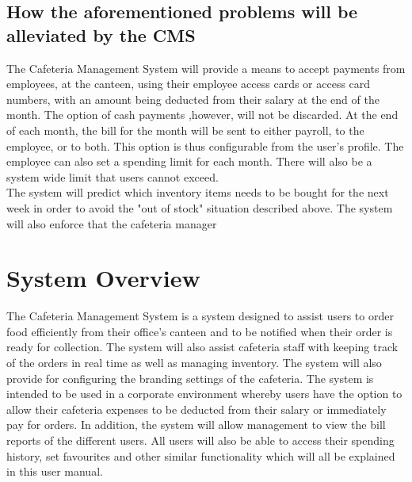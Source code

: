 \documentclass[a4paper,12pt]{report}
\begin{document}
\subsection{How the aforementioned problems will be alleviated by the CMS}
The Cafeteria Management System will provide a means to accept payments from employees, at the canteen, using their employee access cards or access card numbers, with an amount being deducted from their salary at the end of the month.  The option of cash payments ,however, will not be discarded. At the end of each month, the bill for the month will be sent to either payroll, to the employee, or to both. This option is thus configurable from the user's profile. The employee can also set a spending limit for each month. There will also be a system wide limit that users cannot exceed.
\\
The system will predict which inventory items needs to be bought for the next week in order to avoid the "out of stock" situation described above. The system will also enforce that the cafeteria manager 
\\
\section{System Overview}
The Cafeteria Management System is a system designed to assist users to order food efficiently from their office's canteen and to be notified when their order is ready for collection. The system will also assist cafeteria staff with keeping track of the orders in real time as well as managing inventory. The system will also provide for configuring the branding settings of the cafeteria. The system is intended to be used in a corporate environment whereby users have the option to allow their cafeteria expenses to be deducted from their salary or immediately pay for orders. In addition, the system will allow management to view the bill reports of the different users. All users will also be able to access their spending history, set favourites and other similar functionality which will all be explained in this user manual. \\

\end{document}
